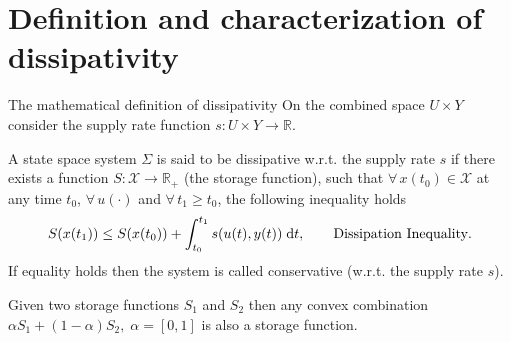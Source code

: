 \documentclass[aspectratio=169]{beamer}
\newcommand{\bbR}{\mathbb{R}}
\begin{document}

\section{Definition and characterization of dissipativity}

\begin{frame}{The mathematical definition of dissipativity}
On the combined space $U × Y$ consider the supply rate function $s : U \times Y \rightarrow \bbR$.

\begin{definition}
A state space system $\Sigma$ is said to be dissipative w.r.t. the supply rate $s$ if there exists a function $S : \mathcal{X} \rightarrow \bbR_+$ (the storage function), such
that $\forall \, x(t_0) \in \mathcal{X}$ at any time $t_0$, $\forall\,  u(\cdot)$ and $\forall\, t_1 \ge t_0$, the following inequality holds
\begin{equation}\label{eq:diss_ineq}
	S(x(t_1)) \le S(x(t_0)) + \int_{t_0}^{t_1} s(u(t), y(t)) \d t, \qquad \text{Dissipation Inequality}.
\end{equation}
If equality holds then the system is called conservative (w.r.t. the supply rate $s$). 
\end{definition}
\begin{corollary}
	Given two storage functions $S_1$ and $S_2$ then any convex combination $\alpha S_1 + (1-\alpha) S_2, \; \alpha=[0,1]$ is also a storage function.
\end{corollary}

\end{frame}
\end{document}
